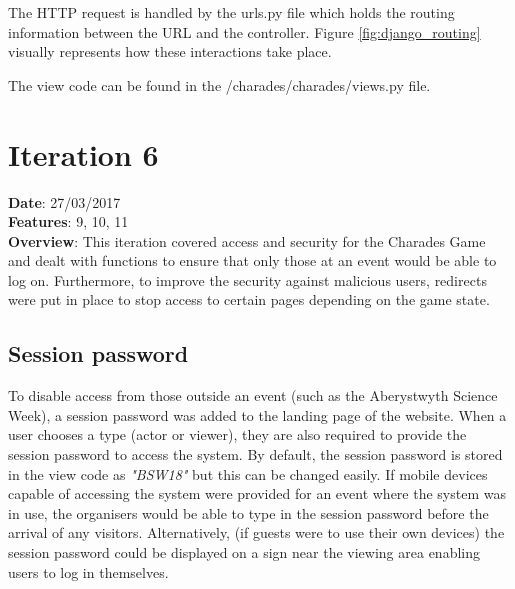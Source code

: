 The HTTP request is handled by the urls.py file which holds the routing information between the URL and the controller. Figure \ref{fig:django_routing} visually represents how these interactions take place.

The view code can be found in the /charades/charades/views.py file.

\begin{figure}[h!]
\end{figure}

\newpage

\section{Iteration 6}
\textbf{Date}: 27/03/2017 \\
\textbf{Features}: 9, 10, 11 \\
\textbf{Overview}: This iteration covered access and security for the Charades Game and dealt with functions to ensure that only those at an event would be able to log on. Furthermore, to improve the security against malicious users, redirects were put in place to stop access to certain pages depending on the game state.

\subsection{Session password}
To disable access from those outside an event (such as the Aberystwyth Science Week), a session password was added to the landing page of the website. When a user chooses a type (actor or viewer), they are also required to provide the session password to access the system. By default, the session password is stored in the view code as \textit{"BSW18"} but this can be changed easily. If mobile devices capable of accessing the system were provided for an event where the system was in use, the organisers would be able to type in the session password before the arrival of any visitors. Alternatively, (if guests were to use their own devices) the session password could be displayed on a sign near the viewing area enabling users to log in themselves.

